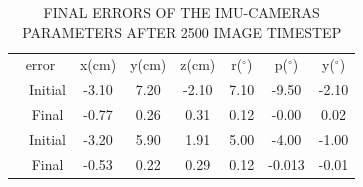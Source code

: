 \documentclass[a4paper, 10pt, conference]{ieeeconf}      %
\begin{document}
\begin{table}
	\caption{FINAL ERRORS OF THE IMU-CAMERAS PARAMETERS AFTER 2500 IMAGE TIMESTEP}
	\label{multiprogram}
	\begin{center}
		\begin{tabular}{|c|c||c|c|c|c|c|c|}
			\hline
			\multicolumn{2}{|c||}{error} & x(cm) & y(cm) & z(cm) & r($ ^\circ $) & p($ ^\circ $) & y($ ^\circ $) \\
			\hhline{==#======}
			\multirow{2}{*}{CAM0}
			&Initial & -3.10 & 7.20 & -2.10 & 7.10  & -9.50 &   -2.10 \\
			
			& Final & -0.77 &  0.26&    0.31 & 0.12&   -0.00&    0.02\\
			\hhline{==#======}
			\multirow{2}{*}{CAM1}
			&Initial &-3.20&    5.90&    1.91 &  5.00&   -4.00&   -1.00 \\
			
			&Final & -0.53 &   0.22&    0.29 & 0.12 &   -0.013& -0.01    \\
			\hline
		\end{tabular}
	\end{center}
\end{table}



\addtolength{\textheight}{-12cm}   %

















\end{document}
